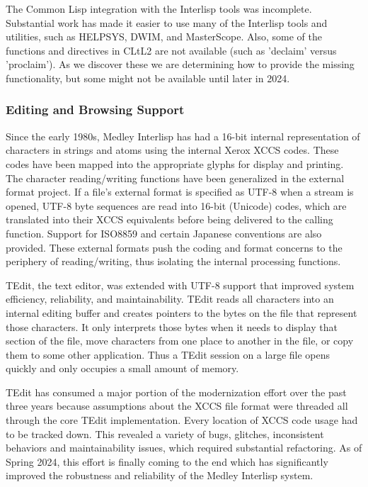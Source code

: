 \documentclass[sigconf]{acmart}
\begin{document}

The Common Lisp integration with the Interlisp tools was incomplete. Substantial work has made it easier to use many of the Interlisp tools and utilities, such as HELPSYS, DWIM, and MasterScope. Also, some of the functions and directives in CLtL2 are not available (such as 'declaim' versus 'proclaim'). As we discover these we are determining how to provide the missing functionality, but some might not be available until later in 2024.

\subsubsection{Editing and Browsing Support}

Since the early 1980s, Medley Interlisp has had a 16-bit internal representation of characters in strings and atoms using the internal Xerox XCCS codes\cite{Nuyens86}. These codes have been mapped into the appropriate glyphs for display and printing. The character reading/writing functions have been generalized in the external format project. If a file's external format is specified as UTF-8 when a stream is opened, UTF-8 byte sequences are read into 16-bit (Unicode) codes, which are translated into their XCCS equivalents before being delivered to the calling function. Support for ISO8859 and certain Japanese conventions are also provided. These external formats push the coding and format concerns to the periphery of reading/writing, thus isolating the internal processing functions\cite{Kaplan21}.

TEdit, the text editor, was extended with UTF-8 support that improved system efficiency, reliability, and maintainability\cite{Xerox86}. TEdit reads all characters into an internal editing buffer and creates pointers to the bytes on the file that represent those characters. It only interprets those bytes when it needs to display that section of the file, move characters from one place to another in the file, or copy them to some other application. Thus a TEdit session on a large file opens quickly and only occupies a small amount of memory.

TEdit has consumed a major portion of the modernization effort over the past three years because assumptions about the XCCS file format were threaded all through the core TEdit implementation. Every location of XCCS code usage had to be tracked down. This revealed a variety of bugs, glitches, inconsistent behaviors and maintainability issues, which required substantial refactoring. As of Spring 2024, this effort is finally coming to the end which has significantly improved the robustness and reliability of the Medley Interlisp system.
\end{document}
